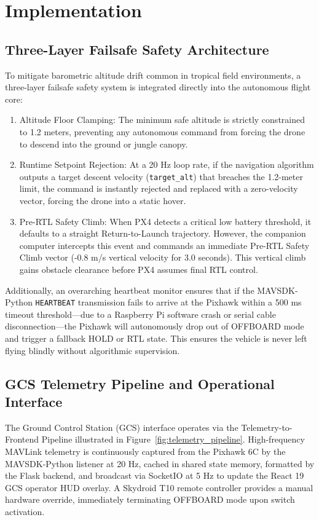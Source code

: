 \documentclass[conference]{IEEEtran}
\begin{document}
\section{Implementation}

\subsection{Three-Layer Failsafe Safety Architecture}
To mitigate barometric altitude drift common in tropical field environments, a three-layer failsafe safety system is integrated directly into the autonomous flight core:
\begin{enumerate}
    \item Altitude Floor Clamping: The minimum safe altitude is strictly constrained to 1.2 meters, preventing any autonomous command from forcing the drone to descend into the ground or jungle canopy.
    \item Runtime Setpoint Rejection: At a 20 Hz loop rate, if the navigation algorithm outputs a target descent velocity (\texttt{target\_alt}) that breaches the 1.2-meter limit, the command is instantly rejected and replaced with a zero-velocity vector, forcing the drone into a static hover.
    \item Pre-RTL Safety Climb: When PX4 detects a critical low battery threshold, it defaults to a straight Return-to-Launch trajectory. However, the companion computer intercepts this event and commands an immediate Pre-RTL Safety Climb vector (-0.8 m/s vertical velocity for 3.0 seconds). This vertical climb gains obstacle clearance before PX4 assumes final RTL control.
\end{enumerate}

Additionally, an overarching heartbeat monitor ensures that if the MAVSDK-Python \texttt{HEARTBEAT} transmission fails to arrive at the Pixhawk within a 500 ms timeout threshold—due to a Raspberry Pi software crash or serial cable disconnection—the Pixhawk will autonomously drop out of OFFBOARD mode and trigger a fallback HOLD or RTL state. This ensures the vehicle is never left flying blindly without algorithmic supervision.

\subsection{GCS Telemetry Pipeline and Operational Interface}
The Ground Control Station (GCS) interface operates via the Telemetry-to-Frontend Pipeline illustrated in Figure~\ref{fig:telemetry_pipeline}. High-frequency MAVLink telemetry is continuously captured from the Pixhawk 6C by the MAVSDK-Python listener at 20 Hz, cached in shared state memory, formatted by the Flask backend, and broadcast via SocketIO at 5 Hz to update the React 19 GCS operator HUD overlay. A Skydroid T10 remote controller provides a manual hardware override, immediately terminating OFFBOARD mode upon switch activation.
\end{document}
